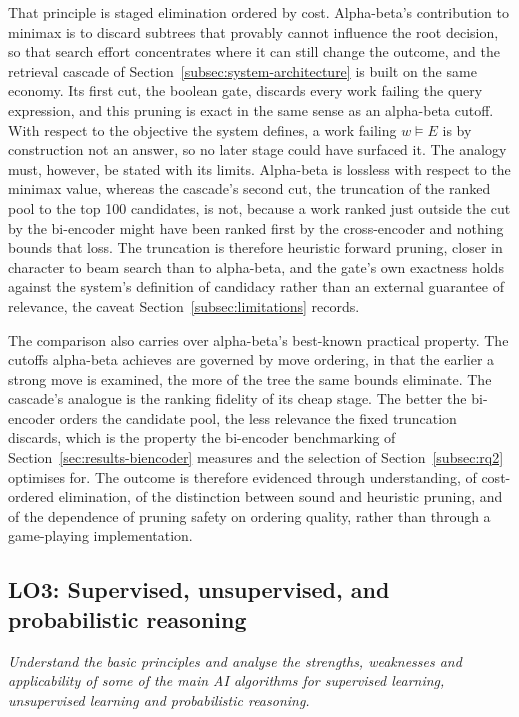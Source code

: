 That principle is staged elimination ordered by cost. Alpha-beta's
contribution to minimax is to discard subtrees that provably cannot
influence the root decision, so that search effort concentrates where it
can still change the outcome, and the retrieval cascade of
Section~\ref{subsec:system-architecture} is built on the same economy. Its first cut,
the boolean gate, discards every work failing the query expression, and
this pruning is exact in the same sense as an alpha-beta cutoff. With
respect to the objective the system defines, a work failing $w \models E$
is by construction not an answer, so no later stage could have surfaced it.
The analogy must, however, be stated with its limits. Alpha-beta is
lossless with respect to the minimax value, whereas the cascade's second
cut, the truncation of the ranked pool to the top 100 candidates, is not,
because a work ranked just outside the cut by the bi-encoder might have
been ranked first by the cross-encoder and nothing bounds that loss. The
truncation is therefore heuristic forward pruning, closer in character to
beam search than to alpha-beta, and the gate's own exactness holds against
the system's definition of candidacy rather than an external guarantee of
relevance, the caveat Section~\ref{subsec:limitations} records.

The comparison also carries over alpha-beta's best-known practical
property. The cutoffs alpha-beta achieves are governed by move ordering, in
that the earlier a strong move is examined, the more of the tree the same
bounds eliminate. The cascade's analogue is the ranking fidelity of its
cheap stage. The better the bi-encoder orders the candidate pool, the less
relevance the fixed truncation discards, which is the property the
bi-encoder benchmarking of Section~\ref{sec:results-biencoder} measures and
the selection of Section~\ref{subsec:rq2} optimises for. The outcome is
therefore evidenced through understanding, of cost-ordered elimination, of
the distinction between sound and heuristic pruning, and of the dependence
of pruning safety on ordering quality, rather than through a game-playing
implementation.

\subsection{LO3: Supervised, unsupervised, and probabilistic reasoning}
\textit{Understand the basic principles and analyse the strengths,
weaknesses and applicability of some of the main AI algorithms for
supervised learning, unsupervised learning and probabilistic reasoning.}

